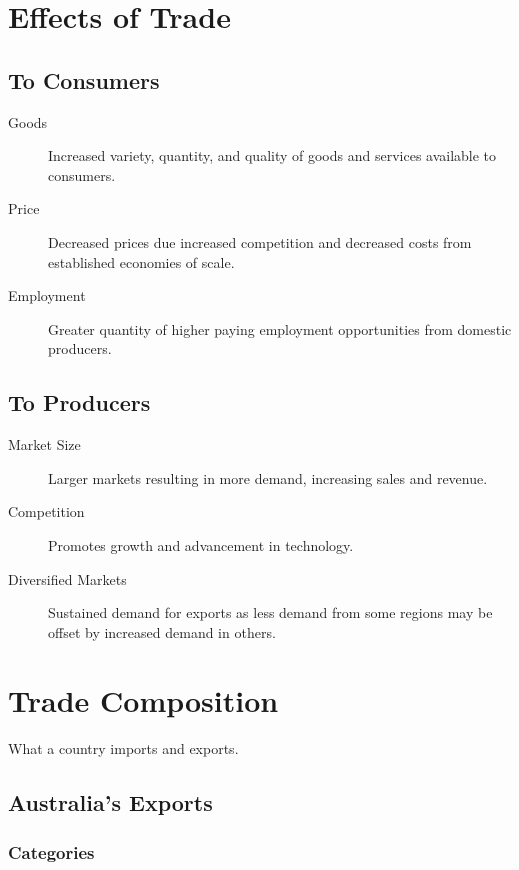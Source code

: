 \documentclass[a4paper,11pt]{article}
\begin{document}
\section{Effects of Trade}

\subsection{To Consumers}

\begin{description}
\item [Goods] Increased variety, quantity, and quality of goods and services
	available to consumers.
\item [Price] Decreased prices due increased competition and decreased costs
	from established economies of scale.
\item [Employment] Greater quantity of higher paying employment opportunities
	from domestic producers.
\end{description}


\subsection{To Producers}

\begin{description}
\item [Market Size] Larger markets resulting in more demand, increasing sales
	and revenue.
\item [Competition] Promotes growth and advancement in technology.
\item [Diversified Markets] Sustained demand for exports as less demand from
	some regions may be offset by increased demand in others.
\end{description}




\section{Trade Composition}

What a country imports and exports.


\subsection{Australia's Exports}

\subsubsection{Categories}
\end{document}
